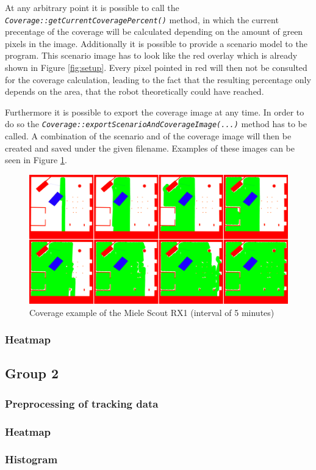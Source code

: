 \documentclass[twoside]{article}
\begin{document}
At any arbitrary point it is possible to call the \textit{\texttt{Coverage::getCurrentCoveragePercent()}} method, in which the current precentage of the coverage will be calculated depending on the amount of green pixels in the image.
Additionally it is possible to provide a scenario model to the program.
This scenario image has to look like the red overlay which is already shown in Figure \ref{fig:setup}.
Every pixel pointed in red will then not be consulted for the coverage calculation, leading to the fact that the resulting percentage only depends on the area, that the robot theoretically could have reached.

Furthermore it is possible to export the coverage image at any time.
In order to do so the \textit{\texttt{Coverage::exportScenarioAndCoverageImage(...)}} method has to be called.
A combination of the scenario and of the coverage image will then be created and saved under the given filename.
Examples of these images can be seen in Figure \ref{fig:coverage}.

\begin{figure}[H]
	\centering
	\includegraphics[width=\textwidth]{pictures/coverage_process.png}
	\caption{Coverage example of the Miele Scout RX1 (interval of 5 minutes)}
	\label{fig:coverage}
\end{figure}

\subsubsection{Heatmap} %

\subsection{Group 2} %
\subsubsection{Preprocessing of tracking data}
\subsubsection{Heatmap}
\subsubsection{Histogram}

\end{document}
